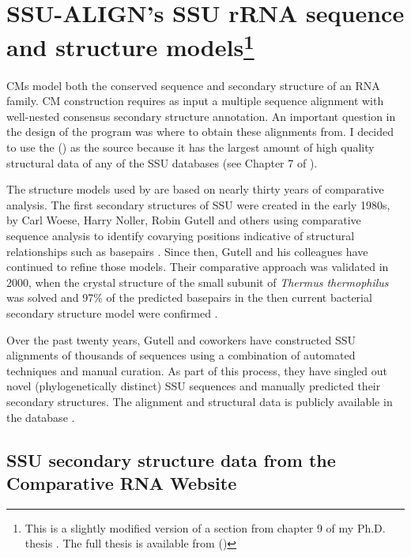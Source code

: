 \section[SSU-ALIGN's SSU rRNA sequence and structure models]{SSU-ALIGN's SSU rRNA sequence and structure
  models\footnote{This is a slightly modified version 
  of a section from chapter 9 of my Ph.D. thesis \cite{Nawrocki09b}.
  The full thesis is available from
  ()}}
\label{sec:models}

CMs model both the conserved sequence and secondary structure of an
RNA family. CM construction requires as input a multiple sequence
alignment with well-nested consensus secondary structure
annotation. An important question in the design of the 
program was where to obtain these alignments from. I decided to use
the  () \cite{CannoneGutell02} as
the source because it has the largest amount of high quality
structural data of any of the SSU databases (see
Chapter 7 of \cite{Nawrocki09b}).

The structure models used by  are based on nearly thirty years of
comparative analysis. The first secondary structures of SSU were
created in the early 1980s, by Carl Woese, Harry Noller, Robin Gutell
and others using comparative sequence analysis to identify covarying
positions indicative of structural relationships such as basepairs
\cite{Woese80,Noller81,Woese83}. Since then, Gutell and his
colleagues have continued to refine those models. Their comparative
approach was validated in 2000, when the crystal structure of the
small subunit of \emph{Thermus thermophilus} was solved
\cite{Wimberly00} and 97\% of the predicted basepairs in the then
current bacterial secondary structure model were confirmed
\cite{Gutell02}.

Over the past twenty years, Gutell and coworkers have constructed SSU
alignments of thousands of sequences using a combination of automated
techniques and manual curation. As part of this process, they have
singled out novel (phylogenetically distinct) SSU sequences and
manually predicted their secondary structures. The alignment and
structural data is publicly available in the  database
\cite{CannoneGutell02}. 

\subsection{SSU secondary structure data from the Comparative RNA
  Website} 

